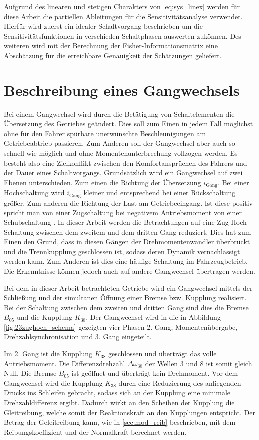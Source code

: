 Aufgrund des linearen und stetigen Charakters von \eqref{eq:sys_linex} werden für diese Arbeit die partiellen Ableitungen für die Sensitivitätsanalyse verwendet.
Hierfür wird zuerst ein idealer Schaltvorgang beschrieben um die Sensitivitätsfunktionen in verschieden Schaltphasen auswerten zukönnen. Des weiteren wird mit der Berechnung der Fisher-Informationsmatrix eine Abschätzung für die erreichbare Genauigkeit der Schätzungen geliefert.
   
\section{Beschreibung eines Gangwechsels}\label{sec:Gangwechsel}
Bei einem Gangwechsel wird durch die Betätigung von Schaltelementen die Übersetzung des Getriebes geändert. Dies soll zum Einen in jedem Fall möglichst ohne für den Fahrer spürbare unerwünschte Beschleunigungen am Getriebeabtrieb passieren. Zum Anderen soll der Gangwechsel aber auch so schnell wie möglich und ohne Momentenunterbrechung vollzogen werden. Es besteht also eine Zielkonflikt zwischen den Komfortansprüchen des Fahrers und der Dauer eines Schaltvorgangs. Grundsätzlich wird ein Gangwechsel auf zwei Ebenen unterschieden. Zum einen die Richtung der Übersetzung $i_\mathrm{Gang}$. Bei einer Hochschaltung wird $i_\mathrm{Gang}$ kleiner und entsprechend bei einer Rückschaltung größer. Zum anderen die Richtung der Last am Getriebeeingang. Ist diese positiv spricht man von einer Zugschaltung bei negativem Antriebsmoment von einer Schubschaltung \cite{Fischer.2016}.
In dieser Arbeit werden die Betrachtungen auf eine Zug-Hoch-Schaltung zwischen dem zweitem und dem dritten Gang reduziert. Dies hat zum Einen den Grund, dass in diesen Gängen der Drehmomentenwandler überbrückt und die Trennkupplung geschlossen ist, sodass deren Dynamik vernachlässigt werden kann. Zum Anderen ist dies eine häufige Schaltung im Fahrzeugbetrieb. Die Erkenntnisse können jedoch auch auf andere Gangwechsel übertragen werden.

Bei dem in dieser Arbeit betrachteten Getriebe wird ein Gangwechsel mittels der Schließung und der simultanen Öffnung einer Bremse bzw. Kupplung realisiert. Bei der Schaltung zwischen dem zweiten und dritten Gang sind dies die Bremse $B_\mathrm{05}$ und die Kupplung $K_\mathrm{38}$. Der Gangwechsel wird in die in Abbildung \ref{fig:23zughoch_schema} gezeigten vier Phasen 2. Gang, Momentenübergabe, Drehzahlsynchronisation und 3. Gang eingeteilt.

Im 2. Gang ist die Kupplung $K_\mathrm{38}$ geschlossen und überträgt das volle Antriebsmoment. Die Differenzdrehzahl $\Delta \omega_{38}$ der Wellen 3 und 8 ist somit gleich Null. Die Bremse $B_\mathrm{05}$ ist geöffnet und überträgt kein Drehmoment. Vor dem Gangwechsel wird die Kupplung $K_\mathrm{38}$ durch eine Reduzierung des anliegenden Drucks ins Schleifen gebracht, sodass sich an der Kupplung eine minimale Drehzahldifferenz ergibt. Dadurch wirkt an den Scheiben der Kupplung die Gleitreibung, welche somit der Reaktionskraft an den Kupplungen entspricht. Der Betrag der Geleitreibung kann, wie in \ref{sec:mod_reib} beschrieben, mit dem Reibungskoeffizient und der Normalkraft berechnet werden.

